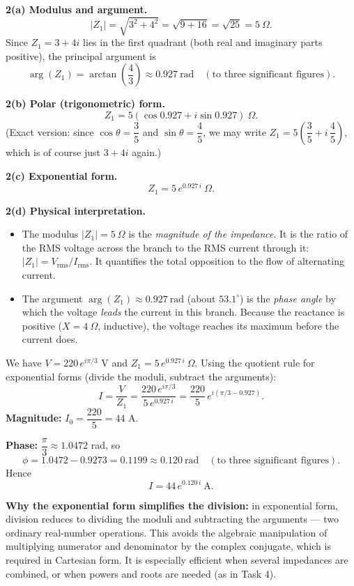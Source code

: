 \documentclass[11pt]{article}
\begin{document}
\begin{exoresolu}
\textbf{2(a) Modulus and argument.}
\[
|Z_1| = \sqrt{3^2 + 4^2} = \sqrt{9+16} = \sqrt{25} = 5\ \Omega.
\]
Since $Z_1 = 3+4i$ lies in the first quadrant (both real and imaginary parts positive), the principal argument is
\[
\arg(Z_1) = \arctan\left(\frac{4}{3}\right) \approx 0.927\ \text{rad} \quad (\text{to three significant figures}).
\]

\textbf{2(b) Polar (trigonometric) form.}
\[
Z_1 = 5\left(\cos 0.927 + i\sin 0.927\right)\ \Omega.
\]
(Exact version: since $\cos\theta = \dfrac{3}{5}$ and $\sin\theta = \dfrac{4}{5}$, we may write $Z_1 = 5\left(\dfrac{3}{5} + i\,\dfrac{4}{5}\right)$, which is of course just $3+4i$ again.)

\textbf{2(c) Exponential form.}
\[
Z_1 = 5\, e^{0.927\, i}\ \Omega.
\]

\textbf{2(d) Physical interpretation.}
\begin{itemize}
    \item The modulus $|Z_1| = 5\ \Omega$ is the \emph{magnitude of the impedance}. It is the ratio of the RMS voltage across the branch to the RMS current through it: $|Z_1| = V_{\text{rms}}/I_{\text{rms}}$. It quantifies the total opposition to the flow of alternating current.
    \item The argument $\arg(Z_1) \approx 0.927\ \text{rad}$ (about $53.1^\circ$) is the \emph{phase angle} by which the voltage \emph{leads} the current in this branch. Because the reactance is positive ($X = 4\ \Omega$, inductive), the voltage reaches its maximum before the current does.
\end{itemize}
\end{exoresolu}

\begin{exoresolu}
We have $V = 220\, e^{i\pi/3}$ V and $Z_1 = 5\, e^{0.927\, i}\ \Omega$. Using the quotient rule for exponential forms (divide the moduli, subtract the arguments):
\[
I = \frac{V}{Z_1} = \frac{220\, e^{i\pi/3}}{5\, e^{0.927\, i}} = \frac{220}{5}\, e^{i(\pi/3 - 0.927)}.
\]
\textbf{Magnitude:} $I_0 = \dfrac{220}{5} = 44$ A.

\textbf{Phase:} $\dfrac{\pi}{3} \approx 1.0472$ rad, so
\[
\phi = 1.0472 - 0.9273 = 0.1199 \approx 0.120\ \text{rad} \quad (\text{to three significant figures}).
\]
Hence
\[
I = 44\, e^{0.120\, i}\ \text{A}.
\]

\textbf{Why the exponential form simplifies the division:} in exponential form, division reduces to dividing the moduli and subtracting the arguments --- two ordinary real-number operations. This avoids the algebraic manipulation of multiplying numerator and denominator by the complex conjugate, which is required in Cartesian form. It is especially efficient when several impedances are combined, or when powers and roots are needed (as in Task 4).
\end{exoresolu}
\end{document}
